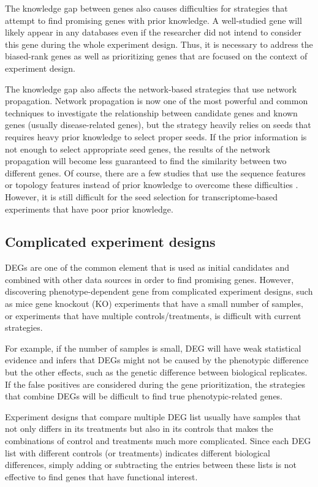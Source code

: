 \documentclass[oneside,phd]{snuthesis}
\begin{document}
The knowledge gap between genes also causes difficulties for strategies that attempt to find promising genes with prior knowledge.
A well-studied gene will likely appear in any databases even if the researcher did not intend to consider this gene during the whole experiment design.
Thus, it is necessary to address the biased-rank genes as well as prioritizing genes that are focused on the context of experiment design.

The knowledge gap also affects the network-based strategies that use network propagation.
Network propagation is now one of the most powerful and common techniques to investigate the relationship between candidate genes and known genes (usually disease-related genes), but the strategy heavily relies on seeds that requires heavy prior knowledge to select proper seeds. 
If the prior information is not enough to select appropriate seed genes, the results of the network propagation will become less guaranteed to find the similarity between two different genes.
Of course, there are a few studies that use the sequence features or topology features instead of prior knowledge to overcome these difficulties \citep{lopez2004genome, adie2005speeding,chen2009toppgene}.
However, it is still difficult for the seed selection for transcriptome-based experiments that have poor prior knowledge.

\subsection{Complicated experiment designs}

DEGs are one of the common element that is used as initial candidates and combined with other data sources in order to find promising genes.
However, discovering phenotype-dependent gene from complicated experiment designs, such as mice gene knockout (KO) experiments that have a small number of samples, or experiments that have multiple controls/treatments, is difficult with current strategies.

For example, if the number of samples is small, DEG will have weak statistical evidence and infers that DEGs might not be caused by the phenotypic difference but the other effects, such as the genetic difference between biological replicates.
If the false positives are considered during the gene prioritization, the strategies that combine DEGs will be difficult to find true phenotypic-related genes. 

Experiment designs that compare multiple DEG list usually have samples that not only differs in its treatments but also in its controls that makes the combinations of control and treatments much more complicated.
Since each DEG list with different controls (or treatments) indicates different biological differences, simply adding or subtracting the entries between these lists is not effective to find genes that have functional interest.
\end{document}
